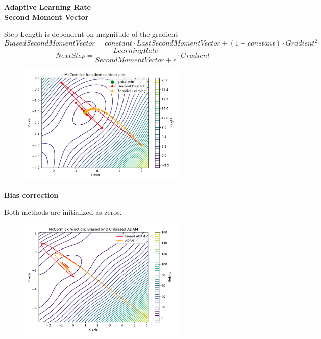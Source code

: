 \documentclass{beamer}
\newcommand\myheading[1]{%
  \par\bigskip
  {\Large\bfseries#1}\par\smallskip}
\begin{document}
\begin{frame}
    \myheading{Adaptive Learning Rate\\Second Moment Vector}
    Step Length is dependent on magnitude of the gradient
    \tiny
    $$Biased Second Moment Vector = constant \cdot LastSecondMomentVector + (1-constant) \cdot Gradient^2$$
    $$NextStep = \frac{LearningRate}{SecondMomentVector + \epsilon} \cdot Gradient $$
    
    \begin{figure}[h]
        \includegraphics[width=8cm]{report/figures/GD_rmsprop.pdf}
    \end{figure}
\end{frame}


\begin{frame}
    \myheading{Bias correction}
    Both methods are initialized as zeros.
    
    \begin{figure}[h]
        \includegraphics[width=8cm]{report/figures/ADAM_bias.pdf}
    \end{figure}
\end{frame}
\end{document}
